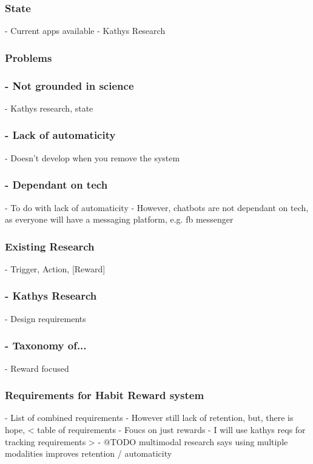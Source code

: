   \subsubsection{State}
      - Current apps available
      - Kathys Research

  \subsubsection{Problems}
      \subsubsection{- Not grounded in science}
        - Kathys research, state
      \subsubsection{- Lack of automaticity}
        - Doesn't develop when you remove the system
      \subsubsection{- Dependant on tech}
        - To do with lack of automaticity
        - However, chatbots are not dependant on tech, as everyone will have a messaging platform, e.g. fb messenger

  \subsubsection{Existing Research}
      - Trigger, Action, [Reward]
      \subsubsection{- Kathys Research}
        - Design requirements
      \subsubsection{- Taxonomy of...}
        - Reward focused


\newpage

  \subsubsection{Requirements for Habit Reward system}
      - List of combined requirements
      - However still lack of retention, but, there is hope,
      <
        table of requirements
        - Foucs on just rewards
        - I will use kathys reqs for tracking requirements
      >
      - @TODO multimodal research says using multiple modalities improves retention / automaticity

